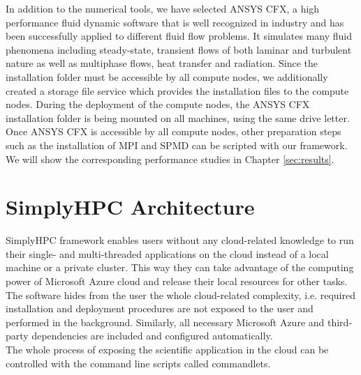 \documentclass[3p,times]{elsarticle}
\begin{document}
In addition to the numerical tools, we have selected ANSYS CFX, a high performance fluid dynamic software that is well recognized in industry and has been successfully applied to different fluid flow problems. It simulates many fluid phenomena including steady-state, transient flows of both laminar and turbulent nature as well as multiphase flows, heat transfer and radiation. Since the installation folder must be accessible by all compute nodes, we additionally created a storage file service which provides the installation files to the compute nodes. During the deployment of the compute nodes, the ANSYS CFX installation folder is being mounted on all machines, using the same drive letter. Once ANSYS CFX is accessible by all compute nodes, other preparation steps such as the installation of MPI and SPMD can be scripted with our framework. We will show the corresponding performance studies in Chapter \ref{sec:results}.

\section{SimplyHPC Architecture}
\label{sec:architecture}


SimplyHPC framework enables users without any cloud-related knowledge to run their single- and multi-threaded applications on the cloud instead of a local machine or a private cluster. This way they can take advantage of the computing power of Microsoft Azure cloud and release their local resources for other tasks. The software hides from the user the whole cloud-related complexity, i.e. required installation and deployment procedures are not exposed to the user and performed in the background. Similarly, all necessary Microsoft Azure and third-party dependencies are included and configured automatically. \\
The whole process of exposing the scientific application in the cloud can be controlled with the command line scripts called commandlets. 
\end{document}
